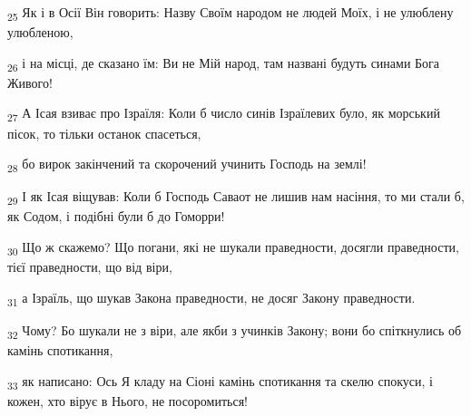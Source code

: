 \begin{tcolorbox}
\textsubscript{25} Як і в Осії Він говорить: Назву Своїм народом не людей Моїх, і не улюблену улюбленою,
\end{tcolorbox}
\begin{tcolorbox}
\textsubscript{26} і на місці, де сказано їм: Ви не Мій народ, там названі будуть синами Бога Живого!
\end{tcolorbox}
\begin{tcolorbox}
\textsubscript{27} А Ісая взиває про Ізраїля: Коли б число синів Ізраїлевих було, як морський пісок, то тільки останок спасеться,
\end{tcolorbox}
\begin{tcolorbox}
\textsubscript{28} бо вирок закінчений та скорочений учинить Господь на землі!
\end{tcolorbox}
\begin{tcolorbox}
\textsubscript{29} І як Ісая віщував: Коли б Господь Саваот не лишив нам насіння, то ми стали б, як Содом, і подібні були б до Гоморри!
\end{tcolorbox}
\begin{tcolorbox}
\textsubscript{30} Що ж скажемо? Що погани, які не шукали праведности, досягли праведности, тієї праведности, що від віри,
\end{tcolorbox}
\begin{tcolorbox}
\textsubscript{31} а Ізраїль, що шукав Закона праведности, не досяг Закону праведности.
\end{tcolorbox}
\begin{tcolorbox}
\textsubscript{32} Чому? Бо шукали не з віри, але якби з учинків Закону; вони бо спіткнулись об камінь спотикання,
\end{tcolorbox}
\begin{tcolorbox}
\textsubscript{33} як написано: Ось Я кладу на Сіоні камінь спотикання та скелю спокуси, і кожен, хто вірує в Нього, не посоромиться!
\end{tcolorbox}
